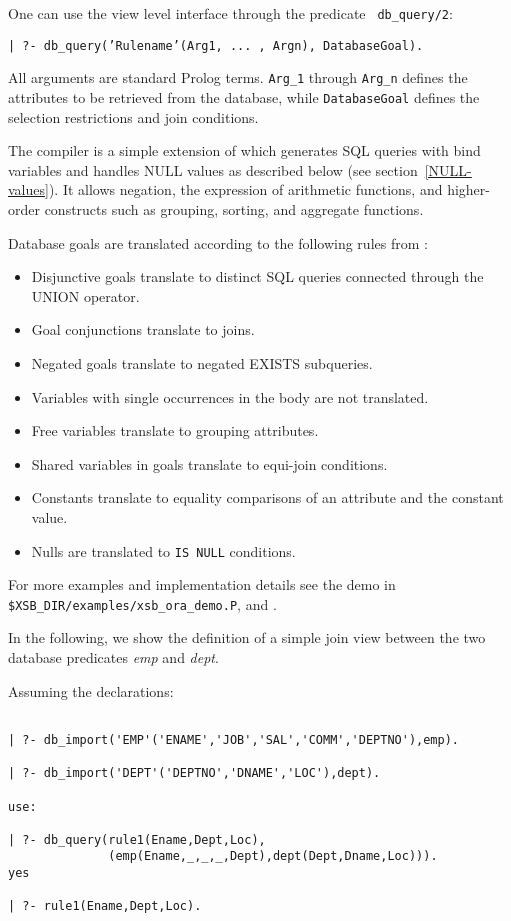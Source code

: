 One can use the view level interface through the predicate {\tt
db\_query/2}:  
\begin{center}
{\tt | ?- db\_query('Rulename'(Arg1, ... , Argn), DatabaseGoal).}
\end{center}
All arguments are standard Prolog terms.  {\tt Arg\_1} through {\tt Arg\_n}
defines the attributes to be retrieved from the database, while
{\tt DatabaseGoal} defines the selection restrictions and join conditions.

The compiler is a simple extension of \cite{Drax92} which generates SQL
queries with bind variables and handles NULL values as described below
(see section~\ref{NULL-values}).  It allows negation, the expression of
arithmetic functions, and higher-order constructs such as grouping,
sorting, and aggregate functions.

Database goals are translated according to the following rules
from \cite{Drax92}:
\begin{itemize}
\item Disjunctive goals translate to distinct SQL queries
	connected through the UNION operator.
\item Goal conjunctions translate to joins.
\item Negated goals translate to negated EXISTS subqueries.
\item Variables with single occurrences in the body are not
	  translated.
\item Free variables translate to grouping attributes.
\item Shared variables in goals translate to equi-join conditions.
\item Constants translate to equality comparisons of an attribute and
	  the constant value.
\item Nulls are translated to {\tt IS NULL} conditions.
\end{itemize}
For more examples and implementation details see the demo in 
{\tt \$XSB\_DIR/examples/xsb\_ora\_demo.P}, and \cite{Drax92}.
 
In the following, we show the definition of a simple join view between the 
two database predicates {\it emp} and {\it dept}.

Assuming the declarations:
\begin{verbatim}

| ?- db_import('EMP'('ENAME','JOB','SAL','COMM','DEPTNO'),emp).

| ?- db_import('DEPT'('DEPTNO','DNAME','LOC'),dept).

use:
	
| ?- db_query(rule1(Ename,Dept,Loc),
	          (emp(Ename,_,_,_,Dept),dept(Dept,Dname,Loc))).
yes

| ?- rule1(Ename,Dept,Loc).
\end{verbatim}

